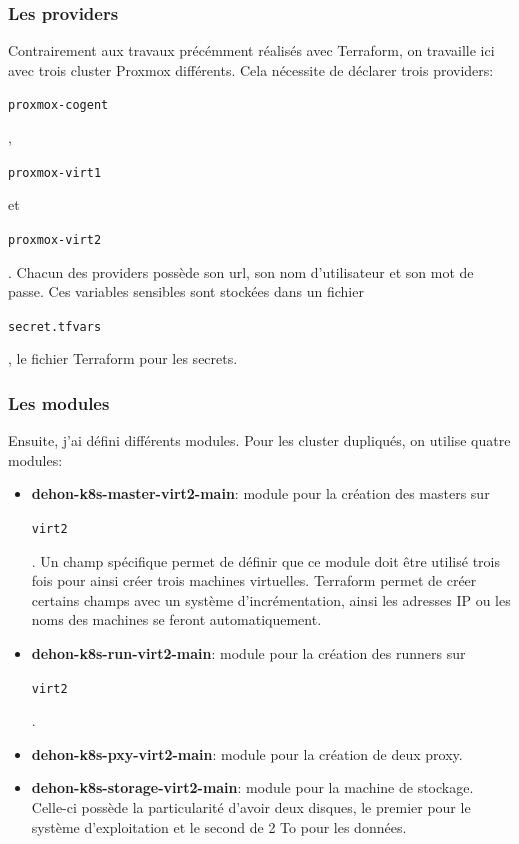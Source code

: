 \documentclass[12pt, a4paper, twoside]{article}
\begin{document}
\subsubsection{Les providers}
Contrairement aux travaux précémment réalisés avec \gls{Terraform}, on travaille ici avec trois \gls{cluster} \gls{Proxmox} différents.
Cela nécessite de déclarer trois providers: \begin{code}\texttt{proxmox-cogent}\end{code},\begin{code}\texttt{proxmox-virt1}\end{code} et\begin{code}\texttt{proxmox-virt2}\end{code}.
Chacun des providers possède son url, son nom d'utilisateur et son mot de passe.
Ces variables sensibles sont stockées dans un fichier \begin{code}\texttt{secret.tfvars}\end{code}, le fichier \gls{Terraform} pour les secrets.

\subsubsection{Les modules}
Ensuite, j'ai défini différents modules. Pour les \gls{cluster} dupliqués, on utilise quatre modules:
\begin{itemize}
    \item \textbf{dehon-k8s-master-virt2-main}: module pour la création des masters sur \begin{code}\texttt{virt2}\end{code}.
    Un champ spécifique permet de définir que ce module doit être utilisé trois fois pour ainsi créer trois machines virtuelles.
    Terraform permet de créer certains champs avec un système d'incrémentation, ainsi les adresses \gls{IP} ou les noms des machines se feront automatiquement.
    \item \textbf{dehon-k8s-run-virt2-main}: module pour la création des runners sur \begin{code}\texttt{virt2}\end{code}.
    \item \textbf{dehon-k8s-pxy-virt2-main}: module pour la création de deux proxy.
    \item \textbf{dehon-k8s-storage-virt2-main}: module pour la machine de stockage.
    Celle-ci possède la particularité d'avoir deux disques, le premier pour le système d'exploitation et le second de 2 To pour les données.
\end{itemize}
\end{document}
